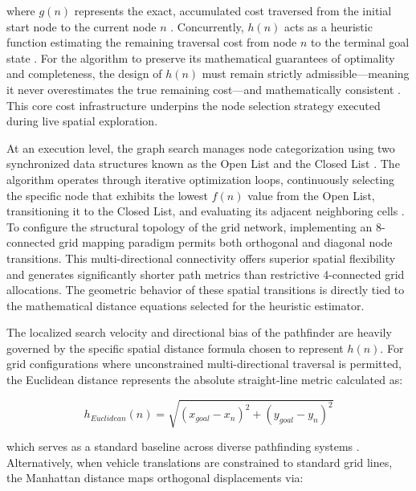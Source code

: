 \noindent where $g(n)$ represents the exact, accumulated cost traversed from the initial start node to the current node $n$ \citep{Karur_2021_surveypath, Noto_2000_methodshortest, Zhang_2021_mobilerobot}. Concurrently, $h(n)$ acts as a heuristic function estimating the remaining traversal cost from node $n$ to the terminal goal state \citep{Karur_2021_surveypath}. For the algorithm to preserve its mathematical guarantees of optimality and completeness, the design of $h(n)$ must remain strictly admissible---meaning it never overestimates the true remaining cost---and mathematically consistent \citep{Yao_2010_pathplanning}. This core cost infrastructure underpins the node selection strategy executed during live spatial exploration.

At an execution level, the graph search manages node categorization using two synchronized data
structures known as the Open List and the Closed List \citep{Chen_2013_fasttwostage, Baskara_2019_applicationslam, DucDung_2021_developmentpath, Zhao_2016_realtimecollision}. The
algorithm operates through iterative optimization loops, continuously selecting the specific node
that exhibits the lowest $f(n)$ value from the Open List, transitioning it to the Closed List, and
evaluating its adjacent neighboring cells \citep{Chen_2013_fasttwostage, Baskara_2019_applicationslam}. To configure the structural
topology of the grid network, implementing an 8-connected grid mapping paradigm permits both
orthogonal and diagonal node transitions. This multi-directional connectivity offers superior
spatial flexibility and generates significantly shorter path metrics than restrictive 4-connected
grid allocations. The geometric behavior of these spatial transitions is directly tied to the
mathematical distance equations selected for the heuristic estimator.

The localized search velocity and directional bias of the pathfinder are heavily governed by the
specific spatial distance formula chosen to represent $h(n)$. For grid configurations where
unconstrained multi-directional traversal is permitted, the Euclidean distance represents the
absolute straight-line metric calculated as:

\begin{equation}
    h_{Euclidean}(n) = \sqrt{(x_{goal} - x_n)^2 + (y_{goal} - y_n)^2}
\end{equation}

\noindent which serves as a standard baseline across diverse pathfinding systems \citep{Karur_2021_surveypath, Zhuang_2019_improvedastar, Zhang_2021_mobilerobot}. Alternatively, when vehicle translations are constrained to standard grid lines, the Manhattan distance maps orthogonal displacements via:

